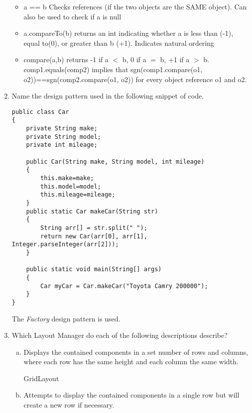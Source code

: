 \documentclass[11pt]{article}
\newenvironment{answer}{\large\lstset{basicstyle=\large}\color{white}}{}
\newenvironment{answer}{\large\lstset{basicstyle=\large}\color{red}}{}
\begin{document}
\begin{enumerate}
\begin{answer}
\begin{itemize}
    \item a == b  Checks references (if the two objects are the SAME object).
    Can also be used to check if a is null  

    \item a.compareTo(b) returns an int indicating whether a is less than (-1),
    equal to(0), or greater than b (+1). Indicates natural ordering 

    \item compare(a,b) returns -1 if a $<$ b, 0 if a $=$ b, +1 if a $>$ b.
    comp1.equals(comp2) implies that sgn(comp1.compare(o1,
    o2))==sgn(comp2.compare(o1, o2)) for every object reference o1 and o2.

    \end{itemize}
    \end{answer}

\item Name the design pattern used in the following snippet of code.
\begin{lstlisting}
public class Car
{
	private String make;
	private String model;
	private int mileage;

	public Car(String make, String model, int mileage)
	{
		this.make=make;
		this.model=model;
		this.mileage=mileage;
	}
	public static Car makeCar(String str)
	{
		String arr[] = str.split(" ");
		return new Car(arr[0], arr[1], Integer.parseInteger(arr[2]));
	}

	public static void main(String[] args)
	{
		Car myCar = Car.makeCar("Toyota Camry 200000");
	}
}
\end{lstlisting}

\begin{answer}
The \emph{Factory} design pattern is used.
\vspace{.5in}
\end{answer}
\pagebreak
\item Which Layout Manager do each of the following descriptions describe?
\begin{enumerate}[(a)]

\item Displays the contained components in a set number of rows and columns,
      where each row has the same height and each column the same width.

\begin{answer}
GridLayout
\vspace{.5in}
\end{answer}

\item Attempts to display the contained components in a single row but will
      create a new row if necessary.


\end{enumerate}
\end{enumerate}
\end{document}
